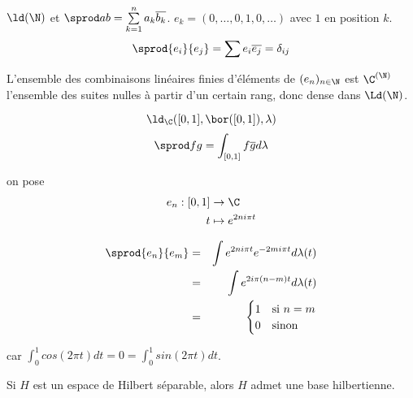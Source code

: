 \begin{exemple}
	$\ld(\N)$  et $\sprod  a b = \sum\limits_{k=1}^n a_k \overline{b_k}$.
	$e_k = (0, \ldots, 0, 1, 0, \ldots)$ avec $1$ en position $k$.
	$$ \sprod {e_i} {e_j} = \sum e_i \overline{e_j} = \delta_{ij} $$

	L'ensemble des combinaisons linéaires finies d'éléments de $(e_n)_{n\in \N}$ est $\C^{(\N)}$ l'ensemble des suites nulles à partir d'un certain rang, donc dense dans $\Ld(\N)$.
\end{exemple}

\begin{exemple}
	$$\ld_{\C}([0,1], \bor([0,1]), \lambda)$$
	$$\sprod f g = \int_{[0,1]} f \overline g d \lambda$$

	on pose \begin{align*}
		e_n : [0,1] & \to \C               \\
		t           & \mapsto e^{2ni\pi t}
	\end{align*}

	\begin{eqnarray*}
		\sprod {e_n} {e_m} &=& \int e^{2ni\pi t} e^{-2mi\pi t} d \lambda (t) \\
		&=& \int  e^{2i\pi (n-m) t} d \lambda (t) \\
		&=& \begin{cases} 1 & \text{si } n=m \\ 0 & \text{sinon} \end{cases}
	\end{eqnarray*}

	car $\int_0^1 cos (2 \pi t) d t = 0 = \int_0^1 sin(2 \pi t) d t$.
\end{exemple}


\begin{theorem}
	Si $H$ est un espace de Hilbert séparable, alors $H$ admet une base hilbertienne.
\end{theorem}

